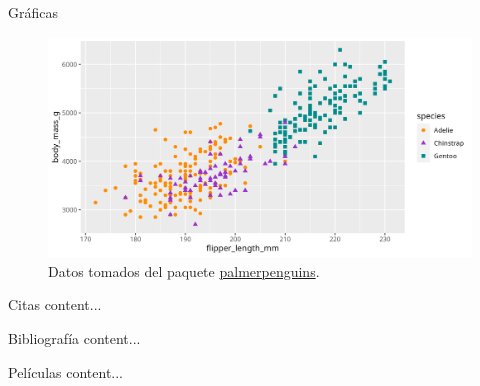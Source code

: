 \documentclass{beamer}
\begin{document}
	\begin{frame}{Gráficas}
		\begin{figure}[h]
			\centering
			\includegraphics[width=0.9\linewidth]{plot}
			\caption{Datos tomados del paquete \href{https://education.rstudio.com/blog/2020/07/palmerpenguins-cran/\#the-palmerpenguins-package}{palmerpenguins}.}
			\label{fig:plot}
		\end{figure}
		
	\end{frame}
	\begin{frame}{Citas}
		content...
	\end{frame}
	\begin{frame}{Bibliografía}
		content...
	\end{frame}
	\begin{frame}{Películas}
		content...
	\end{frame}
	
\end{document}
